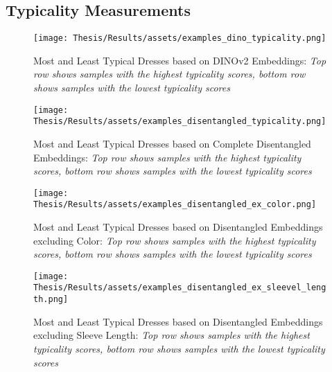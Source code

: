 \FloatBarrier
\subsection*{Typicality Measurements}
\begin{figure}[!ht]
    \centering
    \texttt{[image: Thesis/Results/assets/examples\_dino\_typicality.png]}
    \caption[Most and Least Typical Dresses based on DINOv2 Embeddings]{Most and Least Typical Dresses based on DINOv2 Embeddings: \textit{Top row shows samples with the highest typicality scores, bottom row shows samples with the lowest typicality scores}}
    \label{fig:examples_dino_typicality}
\end{figure}

\begin{figure}[!ht]
    \centering
    \texttt{[image: Thesis/Results/assets/examples\_disentangled\_typicality.png]}
    \caption[Most and Least Typical Dresses based on Complete Disentangled Embeddings]{Most and Least Typical Dresses based on Complete Disentangled Embeddings: \textit{Top row shows samples with the highest typicality scores, bottom row shows samples with the lowest typicality scores}}
    \label{fig:examples_disentangled_typicality}
\end{figure}

\begin{figure}[!ht]
    \centering
    \texttt{[image: Thesis/Results/assets/examples\_disentangled\_ex\_color.png]}
    \caption[Most and Least Typical Dresses based on Disentangled Embeddings excluding Color]{Most and Least Typical Dresses based on Disentangled Embeddings excluding Color: \textit{Top row shows samples with the highest typicality scores, bottom row shows samples with the lowest typicality scores}}
    \label{fig:examples_disentangled_ex_color}
\end{figure}

\begin{figure}[!ht]
    \centering
    \texttt{[image: Thesis/Results/assets/examples\_disentangled\_ex\_sleevel\_length.png]}
    \caption[Most and Least Typical Dresses based on Disentangled Embeddings excluding Sleeve Length]{Most and Least Typical Dresses based on Disentangled Embeddings excluding Sleeve Length: \textit{Top row shows samples with the highest typicality scores, bottom row shows samples with the lowest typicality scores}}
    \label{fig:examples_disentangled_ex_sleevel_length}
\end{figure}

